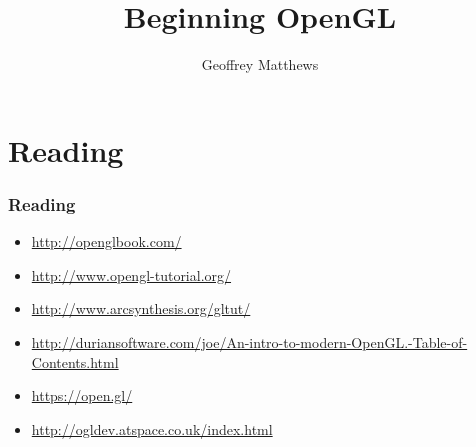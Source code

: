 \documentclass{beamer}
\title
{
Beginning OpenGL
}
\subtitle{} %
\author[Geoffrey Matthews]
{Geoffrey Matthews}
\institute[WWU/CS]
{
  Department of Computer Science\\
  Western Washington University
}
\date{}
\newcommand{\sect}[1]{
\section{#1}
\begin{frame}[fragile]\frametitle{#1}
}
\begin{document}
\begin{frame}
  \titlepage
\end{frame}


\newcommand{\myref}[1]{\small\item\url{#1}}
\newcommand{\myreft}[1]{\footnotesize\item\url{#1}}



\sect{Reading}


\centerline{}

\begin{itemize}

\myref{http://openglbook.com/}
\myref{http://www.opengl-tutorial.org/}
\myref{http://www.arcsynthesis.org/gltut/}
\myref{http://duriansoftware.com/joe/An-intro-to-modern-OpenGL.-Table-of-Contents.html}
\myref{https://open.gl/}
\myref{http://ogldev.atspace.co.uk/index.html}
\end{itemize}

\end{frame}
\end{document}
